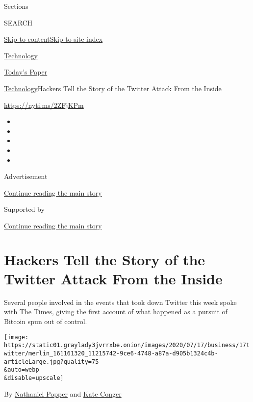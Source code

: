 Sections

SEARCH

\protect\hyperlink{site-content}{Skip to
content}\protect\hyperlink{site-index}{Skip to site index}

\href{https://www.nytimes3xbfgragh.onion/section/technology}{Technology}

\href{https://myaccount.nytimes3xbfgragh.onion/auth/login?response_type=cookie\&client_id=vi}{}

\href{https://www.nytimes3xbfgragh.onion/section/todayspaper}{Today's
Paper}

\href{/section/technology}{Technology}\textbar{}Hackers Tell the Story
of the Twitter Attack From the Inside

\href{https://nyti.ms/2ZFjKPm}{https://nyti.ms/2ZFjKPm}

\begin{itemize}
\item
\item
\item
\item
\item
\end{itemize}

Advertisement

\protect\hyperlink{after-top}{Continue reading the main story}

Supported by

\protect\hyperlink{after-sponsor}{Continue reading the main story}

\hypertarget{hackers-tell-the-story-of-the-twitter-attack-from-the-inside}{%
\section{Hackers Tell the Story of the Twitter Attack From the
Inside}\label{hackers-tell-the-story-of-the-twitter-attack-from-the-inside}}

Several people involved in the events that took down Twitter this week
spoke with The Times, giving the first account of what happened as a
pursuit of Bitcoin spun out of control.

\texttt{[image: https://static01.graylady3jvrrxbe.onion/images/2020/07/17/business/17twitter/merlin\_161161320\_11215742-9ce6-4748-a87a-d905b1324c4b-articleLarge.jpg?quality=75\\\&auto=webp\\\&disable=upscale]}

By
\href{https://www.nytimes3xbfgragh.onion/by/nathaniel-popper}{Nathaniel
Popper} and
\href{https://www.nytimes3xbfgragh.onion/by/kate-conger}{Kate Conger}

